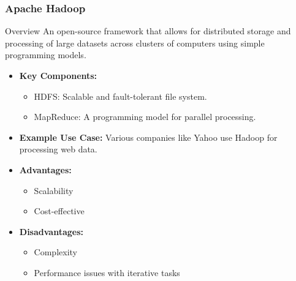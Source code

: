 \documentclass[aspectratio=169]{beamer}
\begin{document}
\begin{frame}[fragile]
    \frametitle{Apache Hadoop}
    \begin{block}{Overview}
        An open-source framework that allows for distributed storage and processing of large datasets across clusters of computers using simple programming models.
    \end{block}
    \begin{itemize}
        \item \textbf{Key Components:}
            \begin{itemize}
                \item HDFS: Scalable and fault-tolerant file system.
                \item MapReduce: A programming model for parallel processing.
            \end{itemize}
        \item \textbf{Example Use Case:} 
            Various companies like Yahoo use Hadoop for processing web data.
        \item \textbf{Advantages:}
            \begin{itemize}
                \item Scalability
                \item Cost-effective
            \end{itemize}
        \item \textbf{Disadvantages:}
            \begin{itemize}
                \item Complexity
                \item Performance issues with iterative tasks
            \end{itemize}
    \end{itemize}
\end{frame}
\end{document}
